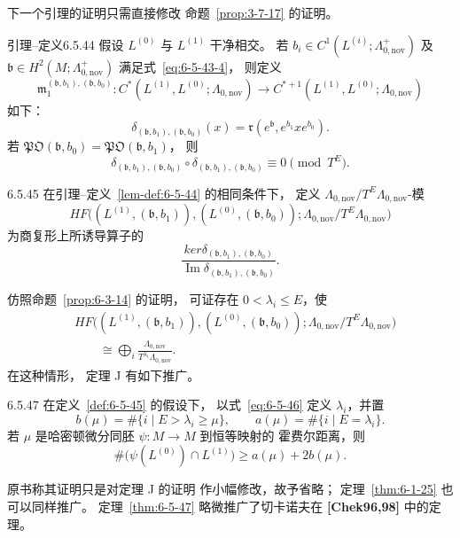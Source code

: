 下一个引理的证明只需直接修改
命题~\ref{prop:3-7-17} 的证明。

\begin{statement}{引理--定义}{6.5.44}\label{lem-def:6-5-44}
假设 $L^{(0)}$ 与 $L^{(1)}$
干净相交。
若
$b_i\in C^1(L^{(i)};
\Lambda_{0,\mathrm{nov}}^+)$
及
$\mathfrak b\in H^2(M;
\Lambda_{0,\mathrm{nov}}^+)$
满足式~\eqref{eq:6-5-43-4}，
则定义
\[
\mathfrak m_1^{(\mathfrak b,b_1),(\mathfrak b,b_0)}:
C^*(L^{(1)},L^{(0)};
\Lambda_{0,\mathrm{nov}})
\longrightarrow
C^{*+1}(L^{(1)},L^{(0)};
\Lambda_{0,\mathrm{nov}})
\]
如下：
\[
\delta_{(\mathfrak b,b_1),(\mathfrak b,b_0)}(x)
=\mathfrak r(e^{\mathfrak b},e^{b_1}xe^{b_0}).
\]
若
$\mathfrak{PO}(\mathfrak b,b_0)
=\mathfrak{PO}(\mathfrak b,b_1)$，
则
\[
\delta_{(\mathfrak b,b_1),(\mathfrak b,b_0)}
\circ
\delta_{(\mathfrak b,b_1),(\mathfrak b,b_0)}
\equiv0\pmod{T^E}.
\]
\end{statement}

\begin{definition}{6.5.45}\label{def:6-5-45}
在引理--定义~\ref{lem-def:6-5-44}
的相同条件下，
定义 $\Lambda_{0,\mathrm{nov}}/
T^E\Lambda_{0,\mathrm{nov}}$-模
\[
HF\bigl((L^{(1)},(\mathfrak b,b_1)),
(L^{(0)},(\mathfrak b,b_0));
\Lambda_{0,\mathrm{nov}}/
T^E\Lambda_{0,\mathrm{nov}}\bigr)
\]
为商复形上所诱导算子的
\[
\frac{ker
\delta_{(\mathfrak b,b_1),(\mathfrak b,b_0)}}
{\operatorname{Im}
\delta_{(\mathfrak b,b_1),(\mathfrak b,b_0)}}.
\]
\end{definition}

仿照命题~\ref{prop:6-3-14} 的证明，
可证存在 $0<\lambda_i\le E$，使
\begin{equation}
\begin{aligned}
&HF\bigl((L^{(1)},(\mathfrak b,b_1)),
(L^{(0)},(\mathfrak b,b_0));
\Lambda_{0,\mathrm{nov}}/
T^E\Lambda_{0,\mathrm{nov}}\bigr)\\
&\qquad\cong
\bigoplus_i
\frac{\Lambda_{0,\mathrm{nov}}}
{T^{\lambda_i}\Lambda_{0,\mathrm{nov}}}.
\end{aligned}
\tag{6.5.46}\label{eq:6-5-46}
\end{equation}
\newpage
在这种情形，
定理 J 有如下推广。

\begin{theorem}{6.5.47}\label{thm:6-5-47}
在定义~\ref{def:6-5-45} 的假设下，
以式~\eqref{eq:6-5-46} 定义
$\lambda_i$，并置
\[
b(\mu)
=\#\{i\mid E>\lambda_i\ge\mu\},
\qquad
a(\mu)
=\#\{i\mid E=\lambda_i\}.
\]
若 $\mu$ 是哈密顿微分同胚
$\psi:M\to M$ 到恒等映射的
霍费尔距离，则
\[
\#\bigl(\psi(L^{(0)})\cap L^{(1)}\bigr)
\ge a(\mu)+2b(\mu).
\]
\end{theorem}

原书称其证明只是对定理 J 的证明
作小幅修改，故予省略；
定理~\ref{thm:6-1-25}
也可以同样推广。
定理~\ref{thm:6-5-47}
略微推广了切卡诺夫在
\textbf{[Chek96,98]} 中的定理。
